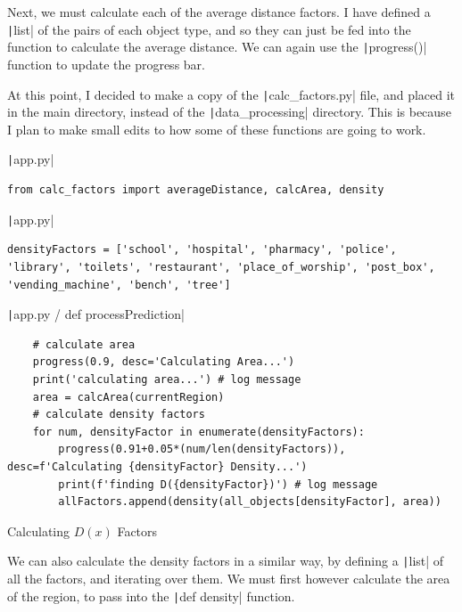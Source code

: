 \documentclass[12pt]{report}
\newcommand{\pil}[1]{\protect\texttt|#1|}
\begin{document}
Next, we must calculate each of the average distance factors. I have defined a \pil{list} of the pairs of each object type, and so they can just be fed into the function to calculate the average distance. We can again use the \pil{progress()} function to update the progress bar.

At this point, I decided to make a copy of the \pil{calc_factors.py} file, and placed it in the main directory, instead of the \pil{data_processing} directory. This is because I plan to make small edits to how some of these functions are going to work.

\begin{listing}[H]
\pil{app.py}
\begin{verbatim}
from calc_factors import averageDistance, calcArea, density
\end{verbatim}
\pil{app.py}
\begin{verbatim}
densityFactors = ['school', 'hospital', 'pharmacy', 'police', 'library', 'toilets', 'restaurant', 'place_of_worship', 'post_box', 'vending_machine', 'bench', 'tree']
\end{verbatim}
\pil{app.py / def processPrediction}
\begin{verbatim}
    # calculate area
    progress(0.9, desc='Calculating Area...')
    print('calculating area...') # log message
    area = calcArea(currentRegion)
    # calculate density factors
    for num, densityFactor in enumerate(densityFactors):
        progress(0.91+0.05*(num/len(densityFactors)), desc=f'Calculating {densityFactor} Density...')
        print(f'finding D({densityFactor})') # log message
        allFactors.append(density(all_objects[densityFactor], area))
\end{verbatim}
\caption{Calculating $D\left(x\right)$ Factors}\label{cs:predictionDensity}
\end{listing}

We can also calculate the density factors in a similar way, by defining a \pil{list} of all the factors, and iterating over them. We must first however calculate the area of the region, to pass into the \pil{def density} function.

\begin{center}
\end{center}
\end{document}

